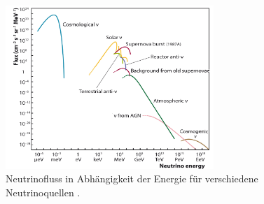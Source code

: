 \begin{figure}
    \centering
    \includegraphics[width=0.7\textwidth]{Plots/neutrinoflux.png}
    \caption[Neutrinofluss in Abhängigkeit der Energie]{Neutrinofluss in Abhängigkeit der Energie für verschiedene Neutrinoquellen \cite{Spiering_2012}.
    }
    \label{fig:neutrino_flux}
\end{figure}

